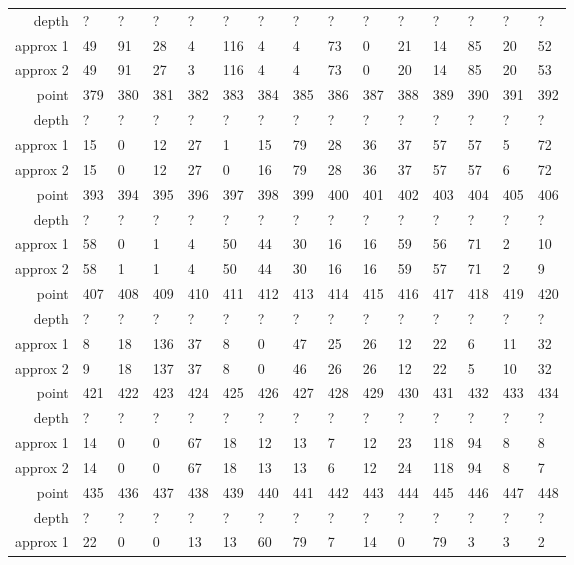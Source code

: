 \begin{center}
\begin{supertabular}{|r|l l l l l l l l l l l l l l|}
\hline
depth & ? & ? & ? & ? & ? & ? & ? & ? & ? & ? & ? & ? & ? & ? \\
approx 1 & 49 & 91 & 28 & 4 & 116 & 4 & 4 & 73 & 0 & 21 & 14 & 85 & 20 & 52 \\
approx 2 & 49 & 91 & 27 & 3 & 116 & 4 & 4 & 73 & 0 & 20 & 14 & 85 & 20 & 53 \\
\hline
point & 379 & 380 & 381 & 382 & 383 & 384 & 385 & 386 & 387 & 388 & 389 & 390 & 391 & 392 \\
\hline
depth & ? & ? & ? & ? & ? & ? & ? & ? & ? & ? & ? & ? & ? & ? \\
approx 1 & 15 & 0 & 12 & 27 & 1 & 15 & 79 & 28 & 36 & 37 & 57 & 57 & 5 & 72 \\
approx 2 & 15 & 0 & 12 & 27 & 0 & 16 & 79 & 28 & 36 & 37 & 57 & 57 & 6 & 72 \\
\hline
point & 393 & 394 & 395 & 396 & 397 & 398 & 399 & 400 & 401 & 402 & 403 & 404 & 405 & 406 \\
\hline
depth & ? & ? & ? & ? & ? & ? & ? & ? & ? & ? & ? & ? & ? & ? \\
approx 1 & 58 & 0 & 1 & 4 & 50 & 44 & 30 & 16 & 16 & 59 & 56 & 71 & 2 & 10 \\
approx 2 & 58 & 1 & 1 & 4 & 50 & 44 & 30 & 16 & 16 & 59 & 57 & 71 & 2 & 9 \\
\hline
point & 407 & 408 & 409 & 410 & 411 & 412 & 413 & 414 & 415 & 416 & 417 & 418 & 419 & 420 \\
\hline
depth & ? & ? & ? & ? & ? & ? & ? & ? & ? & ? & ? & ? & ? & ? \\
approx 1 & 8 & 18 & 136 & 37 & 8 & 0 & 47 & 25 & 26 & 12 & 22 & 6 & 11 & 32 \\
approx 2 & 9 & 18 & 137 & 37 & 8 & 0 & 46 & 26 & 26 & 12 & 22 & 5 & 10 & 32 \\
\hline
point & 421 & 422 & 423 & 424 & 425 & 426 & 427 & 428 & 429 & 430 & 431 & 432 & 433 & 434 \\
\hline
depth & ? & ? & ? & ? & ? & ? & ? & ? & ? & ? & ? & ? & ? & ? \\
approx 1 & 14 & 0 & 0 & 67 & 18 & 12 & 13 & 7 & 12 & 23 & 118 & 94 & 8 & 8 \\
approx 2 & 14 & 0 & 0 & 67 & 18 & 13 & 13 & 6 & 12 & 24 & 118 & 94 & 8 & 7 \\
\hline
point & 435 & 436 & 437 & 438 & 439 & 440 & 441 & 442 & 443 & 444 & 445 & 446 & 447 & 448 \\
\hline
depth & ? & ? & ? & ? & ? & ? & ? & ? & ? & ? & ? & ? & ? & ? \\
approx 1 & 22 & 0 & 0 & 13 & 13 & 60 & 79 & 7 & 14 & 0 & 79 & 3 & 3 & 2 \\

\end{supertabular}
\end{center}
